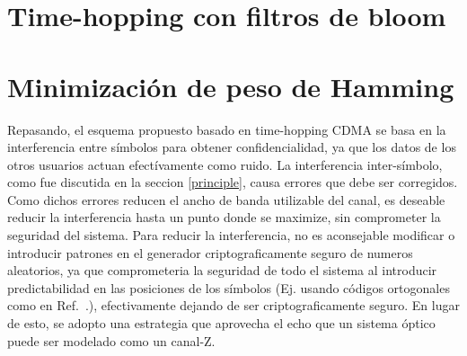 
\section{Time-hopping con filtros de bloom}

\section{Minimización de peso de Hamming}

Repasando, el esquema propuesto basado en time-hopping CDMA se basa en la interferencia entre símbolos para obtener confidencialidad, ya que los datos de los otros usuarios actuan efectívamente como ruido.
La interferencia inter-símbolo, como fue discutida en la seccion \ref{principle}, causa errores que debe ser corregidos. Como dichos errores reducen el ancho de banda utilizable del canal, es deseable reducir la interferencia hasta un punto donde se maximize, sin comprometer la seguridad del sistema. Para reducir la interferencia, no es aconsejable modificar o introducir patrones en el generador criptograficamente seguro de numeros aleatorios, ya que comprometeria la seguridad de todo el sistema al introducir predictabilidad en las posiciones de los símbolos (Ej. usando códigos ortogonales como en Ref.~\cite{Nadarajah2006}.), efectivamente dejando de ser criptograficamente seguro.
En lugar de esto, se adopto una estrategia que aprovecha el echo que un sistema óptico puede ser modelado como un canal-Z.


